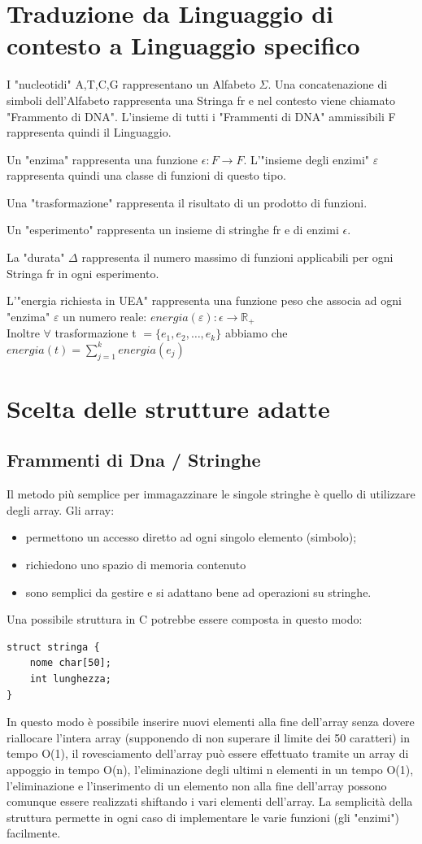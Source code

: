 \documentclass[a4paper,10pt]{article}
\begin{document}
\section{Traduzione da Linguaggio di contesto a Linguaggio specifico}
I "nucleotidi" {A,T,C,G} rappresentano un Alfabeto $\Sigma$. Una concatenazione di simboli dell'Alfabeto rappresenta una Stringa fr e nel contesto viene chiamato "Frammento di DNA". L'insieme di tutti i "Frammenti di DNA" ammissibili {\large F} rappresenta quindi il Linguaggio.

Un "enzima" rappresenta una funzione $\epsilon\colon F\to F$. L'"insieme degli enzimi" $\varepsilon$ rappresenta quindi una classe di funzioni di questo tipo.

Una "trasformazione" rappresenta il risultato di un prodotto di funzioni.

Un "esperimento" rappresenta un insieme di stringhe fr e di enzimi $\epsilon$.

La "durata" $\Delta$ rappresenta il numero massimo di funzioni applicabili per ogni Stringa fr in ogni esperimento.

L'"energia richiesta in UEA" rappresenta una funzione peso che associa ad ogni "enzima" $\varepsilon$ un numero reale: $energia(\varepsilon)\colon\epsilon\to\mathbb{R_+}$
\\Inoltre $\forall$ trasformazione t $=\{e_1,e_2,\dots,e_k\}$ abbiamo che $energia(t)=\sum_{j=1}^k energia(e_j)$

\section{Scelta delle strutture adatte}
\subsection{Frammenti di Dna / Stringhe}\label{sec:fram}
Il metodo più semplice per immagazzinare le singole stringhe è quello di utilizzare degli array. Gli array:
\begin{itemize}
\item permettono un accesso diretto ad ogni singolo elemento (simbolo);
\item richiedono uno spazio di memoria contenuto
\item sono semplici da gestire e si adattano bene ad operazioni su stringhe. 
\end{itemize}
Una possibile struttura in C potrebbe essere composta in questo modo:
\begin{verbatim}
struct stringa {
    nome char[50];
    int lunghezza;
}
\end{verbatim} In questo modo è possibile inserire nuovi elementi alla fine dell'array senza dovere riallocare l'intera array (supponendo di non superare il limite dei 50 caratteri) in tempo O(1), il rovesciamento dell'array può essere effettuato tramite un array di appoggio in tempo O(n), l'eliminazione degli ultimi n elementi in un tempo O(1), l'eliminazione e l'inserimento di un elemento non alla fine dell'array possono comunque essere realizzati shiftando i vari elementi dell'array. La semplicità della struttura permette in ogni caso di implementare le varie funzioni (gli "enzimi") facilmente.
\end{document}
